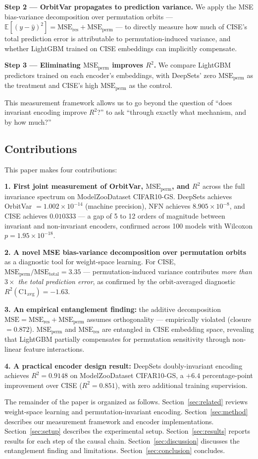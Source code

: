 \textbf{Step 2 --- OrbitVar propagates to prediction variance.} We apply the MSE bias-variance decomposition over permutation orbits --- $\mathbb{E}[(y-\hat{y})^2] = \text{MSE}_\text{res} + \text{MSE}_\text{perm}$ --- to directly measure how much of CISE's total prediction error is attributable to permutation-induced variance, and whether LightGBM trained on CISE embeddings can implicitly compensate.

\textbf{Step 3 --- Eliminating $\text{MSE}_\text{perm}$ improves $R^2$.} We compare LightGBM predictors trained on each encoder's embeddings, with DeepSets' zero $\text{MSE}_\text{perm}$ as the treatment and CISE's high $\text{MSE}_\text{perm}$ as the control.

This measurement framework allows us to go beyond the question of ``does invariant encoding improve $R^2$?'' to ask ``through exactly what mechanism, and by how much?''

\subsection{Contributions}

This paper makes four contributions:

\textbf{1. First joint measurement of OrbitVar, $\text{MSE}_\text{perm}$, and $R^2$} across the full invariance spectrum on ModelZooDataset CIFAR10-GS. DeepSets achieves OrbitVar $= 1.002 \times 10^{-14}$ (machine precision), NFN achieves $8.905 \times 10^{-8}$, and CISE achieves $0.010333$ --- a gap of 5 to 12 orders of magnitude between invariant and non-invariant encoders, confirmed across 100 models with Wilcoxon $p = 1.95 \times 10^{-18}$.

\textbf{2. A novel MSE bias-variance decomposition over permutation orbits} as a diagnostic tool for weight-space learning. For CISE, $\text{MSE}_\text{perm}/\text{MSE}_\text{total} = 3.35$ --- permutation-induced variance contributes \emph{more than $3\times$ the total prediction error}, as confirmed by the orbit-averaged diagnostic $R^2(\text{C1}_\text{avg}) = -1.63$.

\textbf{3. An empirical entanglement finding:} the additive decomposition $\text{MSE} = \text{MSE}_\text{res} + \text{MSE}_\text{perm}$ assumes orthogonality --- empirically violated (closure $= 0.872$). $\text{MSE}_\text{perm}$ and $\text{MSE}_\text{res}$ are entangled in CISE embedding space, revealing that LightGBM partially compensates for permutation sensitivity through non-linear feature interactions.

\textbf{4. A practical encoder design result:} DeepSets doubly-invariant encoding achieves $R^2 = 0.9148$ on ModelZooDataset CIFAR10-GS, a $+6.4$ percentage-point improvement over CISE ($R^2 = 0.851$), with zero additional training supervision.

The remainder of the paper is organized as follows. Section~\ref{sec:related} reviews weight-space learning and permutation-invariant encoding. Section~\ref{sec:method} describes our measurement framework and encoder implementations. Section~\ref{sec:setup} describes the experimental setup. Section~\ref{sec:results} reports results for each step of the causal chain. Section~\ref{sec:discussion} discusses the entanglement finding and limitations. Section~\ref{sec:conclusion} concludes.

